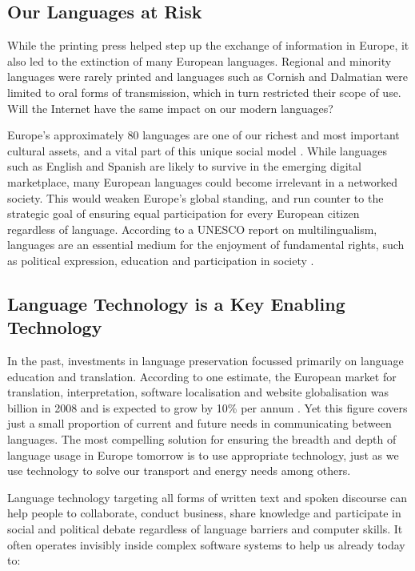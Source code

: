 \documentclass[]{../../metanetpaper}
\begin{document}
\begin{multicols}{2}
\subsection{Our Languages at Risk}

While the printing press helped step up the exchange of information in Europe, it also led to the extinction of many European languages. Regional and minority languages were rarely printed and languages such as Cornish and Dalmatian were limited to oral forms of transmission, which in turn restricted their scope of use. Will the Internet have the same impact on our modern languages?


Europe's approximately 80 languages are one of our richest and most important cultural assets, and a vital part of this unique social model \cite{EC2}. While languages such as English and Spanish are likely to survive in the emerging digital marketplace, many European languages could become irrelevant in a networked society. This would weaken Europe's global standing, and run counter to the strategic goal of ensuring equal participation for every European citizen regardless of language. According to a UNESCO report on multilingualism, languages are an essential medium for the enjoyment of fundamental rights, such as political expression, education and participation in society \cite{Unesco1}.

\subsection{Language Technology is a Key Enabling Technology}

In the past, investments in language preservation focussed primarily on language education and translation. According to one estimate, the European market for translation, interpretation, software localisation and website globalisation was  billion in 2008 and is expected to grow by 10\% per annum \cite{EC3}. Yet this figure covers just a small proportion of current and future needs in communicating between languages. The most compelling solution for ensuring the breadth and depth of language usage in Europe tomorrow is to use appropriate technology, just as we use technology to solve our transport and energy needs among others.

Language technology targeting all forms of written text and spoken discourse can help people to collaborate, conduct business, share knowledge and participate in social and political debate regardless of language barriers and computer skills. It often operates invisibly inside complex software systems to help us already today to:


\end{multicols}
\end{document}
